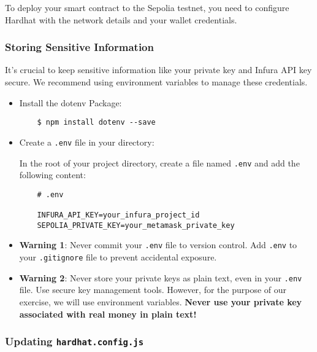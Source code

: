 \documentclass[12pt]{article}
\begin{document}
To deploy your smart contract to the Sepolia testnet, you need to configure Hardhat with the network details and your wallet credentials.

\subsubsection{Storing Sensitive Information}

It's crucial to keep sensitive information like your private key and Infura API key secure. We recommend using environment variables to manage these credentials.

\begin{itemize}

\item Install the dotenv Package:
    
    \begin{verbatim}
    $ npm install dotenv --save
    \end{verbatim}
    
\item Create a \texttt{.env} file in your directory:

    In the root of your project directory, create a file named \texttt{.env} and add the following content:

    \begin{verbatim}
    # .env
    
    INFURA_API_KEY=your_infura_project_id
    SEPOLIA_PRIVATE_KEY=your_metamask_private_key
    \end{verbatim}
\end{itemize}

\begin{itemize}
    \item \textbf{Warning 1}: Never commit your \texttt{.env} file to version control. Add \texttt{.env} to your \texttt{.gitignore} file to prevent accidental exposure.

    \item \textbf{Warning 2}: Never store your private keys as plain text, even in your \texttt{.env} file. Use secure key management tools. However, for the purpose of our exercise, we will use environment variables. \textbf{Never use your private key associated with real money in plain text!}
\end{itemize}

\subsubsection{Updating \texttt{hardhat.config.js}}
\end{document}
